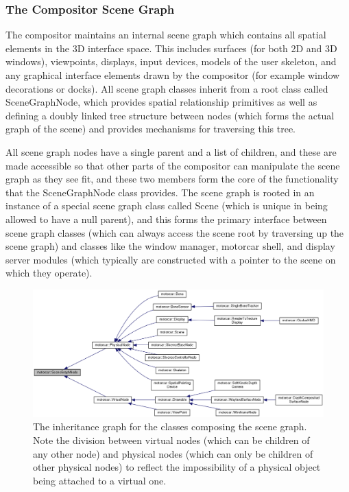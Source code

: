 \subsubsection{The Compositor Scene Graph}



The compositor maintains an internal scene graph which contains all spatial elements in the 3D interface space. This includes surfaces (for both 2D and 3D windows), viewpoints, displays, input devices, models of the user skeleton, and any graphical interface elements drawn by the compositor (for example window decorations or docks). All scene graph classes inherit from a root class called SceneGraphNode, which provides spatial relationship primitives as well as defining a doubly linked tree structure between nodes (which forms the actual graph of the scene) and provides mechanisms for traversing this tree. 

All scene graph nodes have a single parent and a list of children, and these are made accessible so that other parts of the compositor can manipulate the scene graph as they see fit, and these two members form the core of the functionality that the SceneGraphNode class provides. The scene graph is rooted in an instance of a special scene graph class called Scene (which is unique in being allowed to have a null parent), and this forms the primary interface between scene graph classes (which can always access the scene root by traversing up the scene graph) and classes like the window manager, motorcar shell, and display server modules (which typically are constructed with a pointer to the scene on which they operate).

\begin{figure}[ht!]
\centering
\includegraphics[width=1.0\textwidth]{images/scene-graph-classes.png}
\caption{The inheritance graph for the classes composing the scene graph. Note the division between virtual nodes (which can be children of any other node) and physical nodes (which can only be children of other physical nodes) to reflect the impossibility of a physical object being attached to a virtual one.}
\label{fig:scenegraph-classes}
\end{figure}

